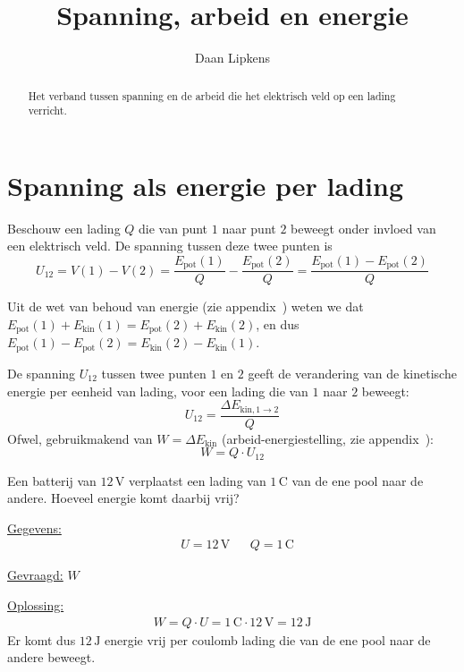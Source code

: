 \documentclass{ximera}
\title{Spanning, arbeid en energie}
\author{Daan Lipkens}
\begin{document}
\begin{abstract}
    Het verband tussen spanning en de arbeid die het elektrisch veld op een lading verricht.
\end{abstract}
\maketitle

\section{Spanning als energie per lading}
Beschouw een lading $Q$ die van punt $1$ naar punt $2$ beweegt onder invloed van een elektrisch veld. De spanning tussen deze twee punten is
\[
    U_{12} = V(1) - V(2) = \frac{E_{\text{pot}}(1)}{Q} - \frac{E_{\text{pot}}(2)}{Q} = \frac{E_{\text{pot}}(1) - E_{\text{pot}}(2)}{Q}
\]

Uit de wet van behoud van energie (zie appendix~) weten we dat $E_{\text{pot}}(1) + E_{\text{kin}}(1) = E_{\text{pot}}(2) + E_{\text{kin}}(2)$, en dus $E_{\text{pot}}(1) - E_{\text{pot}}(2) = E_{\text{kin}}(2) - E_{\text{kin}}(1)$.

\begin{proposition}[foldable=true,title={Betekenis van de spanning}]\nl
De spanning $U_{12}$ tussen twee punten $1$ en $2$ geeft de verandering van de kinetische energie per eenheid van lading, voor een lading die van $1$ naar $2$ beweegt:
\begin{equation}\label{eq:spanning_energie}
    U_{12} = \frac{\Delta E_{\text{kin}, 1 \to 2}}{Q}
\end{equation}
Ofwel, gebruikmakend van $W = \Delta E_{\text{kin}}$ (arbeid-energiestelling, zie appendix~):
\begin{equation}\label{eq:arbeid_spanning}
    W = Q \cdot U_{12}
\end{equation}
\end{proposition}

\begin{example}[foldable=true,title={Voorbeeld: energie geleverd door een batterij}]\nl
Een batterij van $12 \, \mathrm{V}$ verplaatst een lading van $1 \, \mathrm{C}$ van de ene pool naar de andere. Hoeveel energie komt daarbij vrij?

\begin{solution}\nl
\underline{Gegevens:}
\begin{align*}
    & U = 12 \, \mathrm{V} & & Q = 1 \, \mathrm{C}
\end{align*}

\underline{Gevraagd:} $W$

\underline{Oplossing:}
\begin{align*}
    W = Q \cdot U = 1 \, \mathrm{C} \cdot 12 \, \mathrm{V} = 12 \, \mathrm{J}
\end{align*}
Er komt dus $12 \, \mathrm{J}$ energie vrij per coulomb lading die van de ene pool naar de andere beweegt.
\end{solution}
\end{example}
\end{document}
